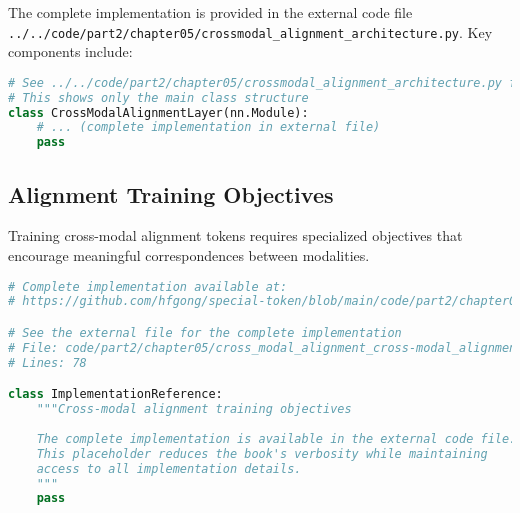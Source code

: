 The complete implementation is provided in the external code file \texttt{../../code/part2/chapter05/crossmodal\_alignment\_architecture.py}. Key components include:

\begin{lstlisting}[language=Python, caption=Core structure (see external file for complete implementation)]
# See ../../code/part2/chapter05/crossmodal_alignment_architecture.py for the complete implementation
# This shows only the main class structure
class CrossModalAlignmentLayer(nn.Module):
    # ... (complete implementation in external file)
    pass
\end{lstlisting}
\subsection{Alignment Training Objectives}

Training cross-modal alignment tokens requires specialized objectives that encourage meaningful correspondences between modalities.
\begin{comment}
Feedback: Before linking to the code, it's helpful to briefly explain the *goal* of these objectives in plain language. For example: "The primary goal of alignment objectives is to force the model to create a shared 'meaning space' where different modalities can be compared. The most common training objectives for this are:
1.  **Contrastive Loss**: Teaches the model to pull representations of corresponding inputs (e.g., a photo of a dog and the text 'a dog') together, while pushing non-corresponding inputs apart.
2.  **Matching Loss**: A binary classification task where the model is given a pair of inputs from different modalities and must predict whether they match or not.
3.  **Cross-Modal Generation**: Forcing the model to generate the representation of one modality from another (e.g., generating a text caption from an image)."
\end{comment}

\begin{lstlisting}[language=Python, caption={Cross-modal alignment training objectives}]
# Complete implementation available at:
# https://github.com/hfgong/special-token/blob/main/code/part2/chapter05/cross_modal_alignment_cross-modal_alignment_training.py

# See the external file for the complete implementation
# File: code/part2/chapter05/cross_modal_alignment_cross-modal_alignment_training.py
# Lines: 78

class ImplementationReference:
    """Cross-modal alignment training objectives
    
    The complete implementation is available in the external code file.
    This placeholder reduces the book's verbosity while maintaining
    access to all implementation details.
    """
    pass
\end{lstlisting}

